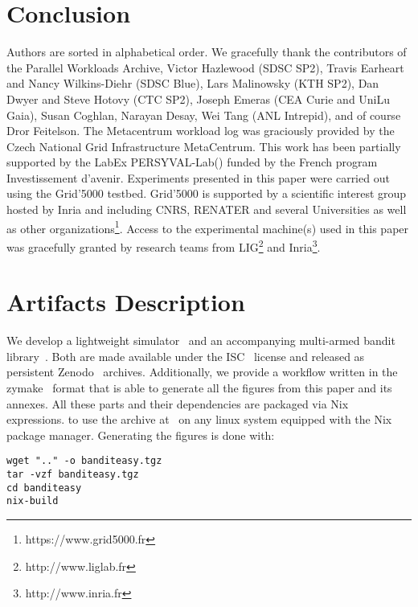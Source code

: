 \documentclass[sigconf]{acmart}
\begin{document}
\section{Conclusion}
\label{sec:ccl}

\begin{acks}

Authors are sorted in alphabetical order. We gracefully thank the contributors
of the Parallel Workloads Archive, Victor Hazlewood (SDSC SP2), Travis Earheart
and Nancy Wilkins-Diehr (SDSC Blue), Lars Malinowsky (KTH SP2), Dan Dwyer and
Steve Hotovy (CTC SP2), Joseph Emeras (CEA Curie and UniLu Gaia), Susan
Coghlan, Narayan Desay, Wei Tang (ANL Intrepid), and of course Dror Feitelson.
The Metacentrum workload log was graciously provided by the Czech National Grid
Infrastructure MetaCentrum. This work has been partially supported by the LabEx
PERSYVAL-Lab() funded by
the French program Investissement d'avenir. Experiments presented in this paper
were carried out using the Grid'5000 testbed. Grid'5000 is supported by a
scientific interest group hosted by Inria and including CNRS, RENATER and
several Universities as well as other
organizations\footnote{https://www.grid5000.fr}.  Access to the experimental
machine(s) used in this paper was gracefully granted by research teams from
LIG\footnote{http://www.liglab.fr} and Inria\footnote{http://www.inria.fr}.

\end{acks}




\clearpage
\section*{Artifacts Description}

We develop a lightweight simulator~\cite{ocst} and an accompanying multi-armed
bandit library~\cite{obandit}. Both are made available under the ISC~\cite{isc}
license and released as persistent Zenodo~\cite{zenodo} archives. Additionally,
we provide a workflow written in the zymake~\cite{breck2008zymake} format that
is able to generate all the figures from this paper and its annexes. All these
parts and their dependencies are packaged via Nix~\cite{nix} expressions.
to use the
archive at~\cite{repro} on any linux system equipped with the Nix package manager.
Generating the figures is done with:

\begin{lstlisting}
wget ".." -o banditeasy.tgz
tar -vzf banditeasy.tgz
cd banditeasy
nix-build
\end{lstlisting}
\end{document}
